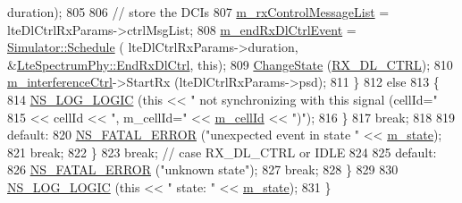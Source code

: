 \begin{DoxyCode}
      duration);
805               
806               \textcolor{comment}{// store the DCIs}
807               \hyperlink{classns3_1_1LteSpectrumPhy_ad0e520fb4b440e47e9d2b17b3c5fd05d}{m\_rxControlMessageList} = lteDlCtrlRxParams->ctrlMsgList;
808               \hyperlink{classns3_1_1LteSpectrumPhy_a18bd7b8d75f490ed803c75ace45ee346}{m\_endRxDlCtrlEvent} = \hyperlink{classns3_1_1Simulator_a671882c894a08af4a5e91181bf1eec13}{Simulator::Schedule} (
      lteDlCtrlRxParams->duration, &\hyperlink{classns3_1_1LteSpectrumPhy_a88ff185754afa38f1bceb9f1641bdabc}{LteSpectrumPhy::EndRxDlCtrl}, \textcolor{keyword}{this});
809               \hyperlink{classns3_1_1LteSpectrumPhy_a64a105b7c580b3d6dc5cd4b97d1223d9}{ChangeState} (\hyperlink{classns3_1_1LteSpectrumPhy_a52ce2cf9b4846807449c50399f6b8000ac85f9c84ab77d31b1aba0b7d8ca4482b}{RX\_DL\_CTRL});
810               \hyperlink{classns3_1_1LteSpectrumPhy_ad578c25e0d4dd05b888c4dd83ec52e13}{m\_interferenceCtrl}->StartRx (lteDlCtrlRxParams->psd);            
811             \}
812           \textcolor{keywordflow}{else}
813             \{
814               \hyperlink{group__logging_ga88acd260151caf2db9c0fc84997f45ce}{NS\_LOG\_LOGIC} (\textcolor{keyword}{this} << \textcolor{stringliteral}{" not synchronizing with this signal (cellId="} 
815                             << cellId  << \textcolor{stringliteral}{", m\_cellId="} << \hyperlink{classns3_1_1LteSpectrumPhy_a996732fedbe320aedd9d2def1fc6e3c7}{m\_cellId} << \textcolor{stringliteral}{")"});          
816             \}
817           \textcolor{keywordflow}{break};
818           
819         \textcolor{keywordflow}{default}:
820           \hyperlink{group__fatal_ga5131d5e3f75d7d4cbfd706ac456fdc85}{NS\_FATAL\_ERROR} (\textcolor{stringliteral}{"unexpected event in state "} << \hyperlink{classns3_1_1LteSpectrumPhy_a985b6688f1bbfcd8703096040b5c9b10}{m\_state});
821           \textcolor{keywordflow}{break};
822         \}
823       \textcolor{keywordflow}{break}; \textcolor{comment}{// case RX\_DL\_CTRL or IDLE}
824       
825     \textcolor{keywordflow}{default}:
826       \hyperlink{group__fatal_ga5131d5e3f75d7d4cbfd706ac456fdc85}{NS\_FATAL\_ERROR} (\textcolor{stringliteral}{"unknown state"});
827       \textcolor{keywordflow}{break};
828     \}
829   
830   \hyperlink{group__logging_ga88acd260151caf2db9c0fc84997f45ce}{NS\_LOG\_LOGIC} (\textcolor{keyword}{this} << \textcolor{stringliteral}{" state: "} << \hyperlink{classns3_1_1LteSpectrumPhy_a985b6688f1bbfcd8703096040b5c9b10}{m\_state});
831 \}
\end{DoxyCode}


